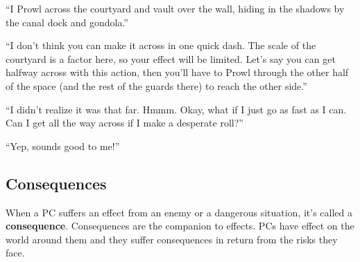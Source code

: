 \begin{qb}``I Prowl across the courtyard and vault over the wall, hiding in the shadows by the canal dock and gondola.''

\vspace{1em}
``I don’t think you can make it across in one quick dash. The scale of the courtyard is a factor here, so your effect will be limited. Let’s say you can get halfway across with this action, then you’ll have to Prowl through the other half of the space (and the rest of the guards there) to reach the other side.''

\vspace{1em}

``I didn’t realize it was that far. Hmmm. Okay, what if I just go as fast as I can. Can I get all the way across if I make a desperate roll?''

\vspace{1em}

``Yep, sounds good to me!''\end{qb}

\subsection{Consequences}

When a PC suffers an effect from an enemy or a dangerous situation, it’s called a \textbf{consequence}. Consequences are the companion to effects. PCs have effect on the world around them and they suffer consequences in return from the risks they face.
